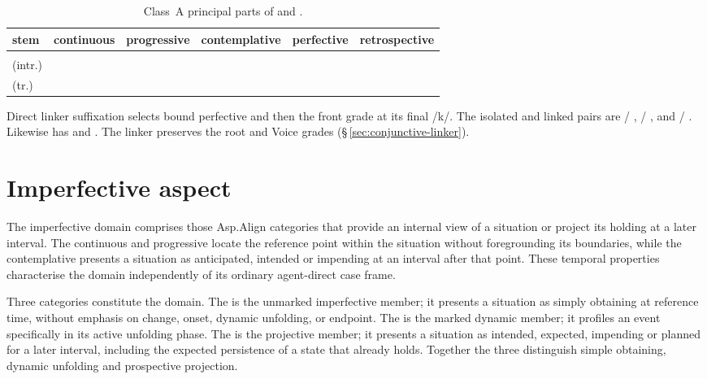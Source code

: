 \begin{table}[htbp]
\footnotesize
\caption{Class~A principal parts of  and .}
\label{tab:read-sing-principal-parts}
\begin{tabularx}{\textwidth}{L L L L L L}
\toprule
{\sc stem} & {\sc continuous} & {\sc progressive} & {\sc contemplative} & {\sc perfective} & {\sc retrospective} \\
\midrule
{} &  &  &  &  &  \\
 (intr.) &  &  &  &  &  \\
 (tr.) &  &  &  &  &  \\
\bottomrule
\end{tabularx}
\end{table}

Direct linker suffixation selects bound perfective  and then
the front grade at its final /k/. The isolated and linked pairs are
 / ,
 / ,
and  / .
Likewise  has
 and
.
The linker preserves the root and Voice grades
(§\,\ref{sec:conjunctive-linker}).

\section{Imperfective aspect}
\label{sec:aspect-ipf}

The imperfective domain comprises those Asp.Align categories that provide
an internal view of a situation or project its holding at a later interval.
The continuous and progressive locate the reference point within the
situation without foregrounding its boundaries, while the contemplative
presents a situation as anticipated, intended or impending at an interval
after that point. These temporal properties characterise the domain
independently of its ordinary agent-direct case frame.

Three categories constitute the domain. The  is the unmarked
imperfective member; it presents a situation as simply obtaining at reference
time, without emphasis on change, onset, dynamic unfolding, or endpoint. The
 is the marked dynamic member; it profiles an event
specifically in its active unfolding phase. The  is the
projective member; it presents a situation as intended, expected, impending
or planned for a later interval, including the expected persistence of a
state that already holds. Together the three distinguish simple obtaining,
dynamic unfolding and prospective projection.

